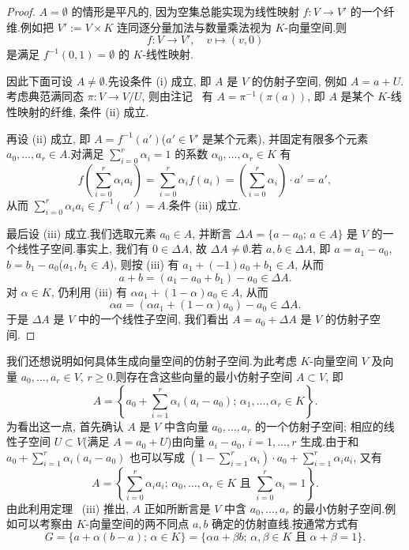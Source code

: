 \begin{proof}
$A = \emptyset$ 的情形是平凡的, 因为空集总能实现为线性映射 $f \colon V \longrightarrow V'$ 的一个纤维.例如把 $V' := V \times K$ 连同逐分量加法与数量乘法视为 $K$-向量空间.则
\[
f \colon V \longrightarrow V', \quad v \longmapsto (v, 0)
\]
是满足 $f^{-1}(0, 1) = \emptyset$ 的 $K$-线性映射.

因此下面可设 $A \neq \emptyset$.先设条件 (i) 成立, 即 $A$ 是 $V$ 的仿射子空间, 例如 $A = a + U$.考虑典范满同态 $\pi \colon V \longrightarrow V/U$, 则由注记~ 有 $A = \pi^{-1}(\pi(a))$, 即 $A$ 是某个 $K$-线性映射的纤维, 条件 (ii) 成立.

再设 (ii) 成立, 即 $A = f^{-1}(a')$($a' \in V'$ 是某个元素), 并固定有限多个元素 $a_0, \ldots, a_r \in A$.对满足 $\sum_{i = 0}^{r} \alpha_i = 1$ 的系数 $\alpha_0, \ldots, \alpha_r \in K$ 有
\[
f\left(\sum_{i = 0}^{r} \alpha_i a_i\right) = \sum_{i = 0}^{r} \alpha_i f(a_i) = \left(\sum_{i = 0}^{r} \alpha_i\right) \cdot a' = a',
\]
从而 $\sum_{i = 0}^{r} \alpha_i a_i \in f^{-1}(a') = A$.条件 (iii) 成立.

最后设 (iii) 成立.我们选取元素 $a_0 \in A$, 并断言 $\Delta A = \{a - a_0;\, a \in A\}$ 是 $V$ 的一个线性子空间.事实上, 我们有 $0 \in \Delta A$, 故 $\Delta A \neq \emptyset$.若 $a, b \in \Delta A$, 即 $a = a_1 - a_0$, $b = b_1 - a_0$($a_1, b_1 \in A$), 则按 (iii) 有 $a_1 + (-1)a_0 + b_1 \in A$, 从而
\[
a + b = (a_1 - a_0 + b_1) - a_0 \in \Delta A\text{.}
\]
对 $\alpha \in K$, 仍利用 (iii) 有 $\alpha a_1 + (1 - \alpha)a_0 \in A$, 从而
\[
\alpha a = (\alpha a_1 + (1 - \alpha)a_0) - a_0 \in \Delta A\text{.}
\]
于是 $\Delta A$ 是 $V$ 中的一个线性子空间, 我们看出 $A = a_0 + \Delta A$ 是 $V$ 的仿射子空间.
\end{proof}

我们还想说明如何具体生成向量空间的仿射子空间.为此考虑 $K$-向量空间 $V$ 及向量 $a_0, \ldots, a_r \in V$, $r \geq 0$.则存在含这些向量的最小仿射子空间 $A \subset V$, 即
\[
A = \left\{a_0 + \sum_{i = 1}^{r} \alpha_i(a_i - a_0);\, \alpha_1, \ldots, \alpha_r \in K\right\}\text{.}
\]
为看出这一点, 首先确认 $A$ 是 $V$ 中含向量 $a_0, \ldots, a_r$ 的一个仿射子空间; 相应的线性子空间 $U \subset V$(满足 $A = a_0 + U$)由向量 $a_i - a_0$, $i = 1, \ldots, r$ 生成.由于和 $a_0 + \sum_{i = 1}^{r} \alpha_i(a_i - a_0)$ 也可以写成 $\left(1 - \sum_{i = 1}^{r} \alpha_i\right) \cdot a_0 + \sum_{i = 1}^{r} \alpha_i a_i$, 又有
\[
A = \left\{\sum_{i = 0}^{r} \alpha_i a_i;\, \alpha_0, \ldots, \alpha_r \in K \text{ 且 } \sum_{i = 0}^{r} \alpha_i = 1\right\}\text{.}
\]
由此利用定理~ (iii) 推出, $A$ 正如所断言是 $V$ 中含 $a_0, \ldots, a_r$ 的最小仿射子空间.例如可以考察由 $K$-向量空间的两不同点 $a, b$ 确定的仿射直线.按通常方式有
\[
G = \{a + \alpha(b - a);\, \alpha \in K\} = \{\alpha a + \beta b;\, \alpha, \beta \in K \text{ 且 } \alpha + \beta = 1\}\text{.}
\]

